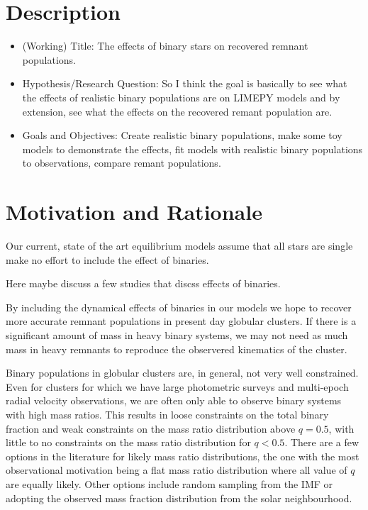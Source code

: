\documentclass[12pt,letterpaper]{article}
\newcommand{\software}[1]{\textrm{\MakeUppercase{#1}}}
\begin{document}
\section{Description}
\begin{itemize}
	\item (Working) Title: The effects of binary stars on recovered remnant populations.
	\item Hypothesis/Research Question: So I think the goal is basically to see what the effects
	      of realistic binary populations are on \software{limepy} models and by extension, see
	      what the effects on the recovered remant population are.
	\item Goals and Objectives: Create realistic binary populations, make some toy models to
	      demonstrate the effects, fit models with realistic binary populations to observations,
	      compare remant populations.
\end{itemize}

\section{Motivation and Rationale}

Our current, state of the art equilibrium models assume that all stars are single make no effort to
include the effect of binaries.

Here maybe discuss a few studies that discss effects of binaries.


By including the dynamical effects of binaries in our models we hope to recover more accurate
remnant populations in present day globular clusters. If there is a significant amount of mass in
heavy binary systems, we may not need as much mass in heavy remnants to reproduce the observered
kinematics of the cluster.


Binary populations in globular clusters are, in general, not very well constrained. Even for
clusters for which we have large photometric surveys and multi-epoch radial velocity observations,
we are often only able to observe binary systems with high mass ratios. This results in loose
constraints on the total binary fraction and weak constraints on the mass ratio distribution above $
q = 0.5$, with little to no constraints on the mass ratio distribution for $q < 0.5$. There are a
few options in the literature for likely mass ratio distributions, the one with the most
observational motivation being a flat mass ratio distribution where all value of $q$ are equally
likely. Other options include random sampling from the IMF or adopting the observed mass fraction
distribution from the solar neighbourhood.
\end{document}
